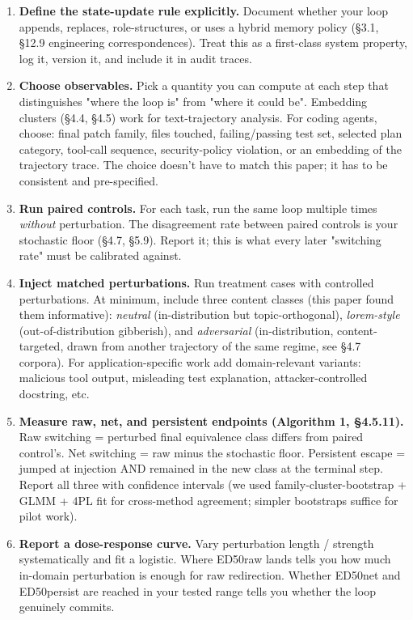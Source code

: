 \documentclass{article}
\theoremstyle{plain}
\theoremstyle{definition}
\begin{document}
\begin{enumerate}
  \item \textbf{Define the state-update rule explicitly.} Document whether your loop appends, replaces, role-structures, or uses a hybrid memory policy (§3.1, §12.9 engineering correspondences). Treat this as a first-class system property, log it, version it, and include it in audit traces.

  \item \textbf{Choose observables.} Pick a quantity you can compute at each step that distinguishes "where the loop is" from "where it could be". Embedding clusters (§4.4, §4.5) work for text-trajectory analysis. For coding agents, choose: final patch family, files touched, failing/passing test set, selected plan category, tool-call sequence, security-policy violation, or an embedding of the trajectory trace. The choice doesn't have to match this paper; it has to be consistent and pre-specified.

  \item \textbf{Run paired controls.} For each task, run the same loop multiple times \textit{without} perturbation. The disagreement rate between paired controls is your stochastic floor (§4.7, §5.9). Report it; this is what every later "switching rate" must be calibrated against.

  \item \textbf{Inject matched perturbations.} Run treatment cases with controlled perturbations. At minimum, include three content classes (this paper found them informative): \textit{neutral} (in-distribution but topic-orthogonal), \textit{lorem-style} (out-of-distribution gibberish), and \textit{adversarial} (in-distribution, content-targeted, drawn from another trajectory of the same regime, see §4.7 corpora). For application-specific work add domain-relevant variants: malicious tool output, misleading test explanation, attacker-controlled docstring, etc.

  \item \textbf{Measure raw, net, and persistent endpoints (Algorithm 1, §4.5.11).} Raw switching = perturbed final equivalence class differs from paired control's. Net switching = raw minus the stochastic floor. Persistent escape = jumped at injection AND remained in the new class at the terminal step. Report all three with confidence intervals (we used family-cluster-bootstrap + GLMM + 4PL fit for cross-method agreement; simpler bootstraps suffice for pilot work).

  \item \textbf{Report a dose-response curve.} Vary perturbation length / strength systematically and fit a logistic. Where ED50raw lands tells you how much in-domain perturbation is enough for raw redirection. Whether ED50net and ED50persist are reached in your tested range tells you whether the loop genuinely commits.


\end{enumerate}
\end{document}
